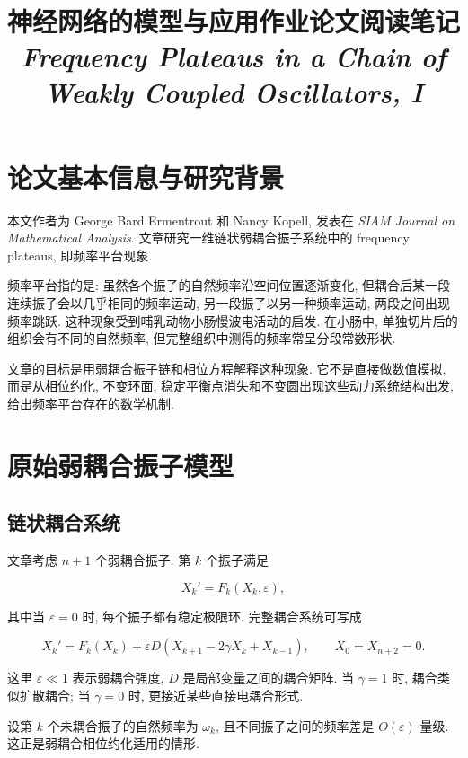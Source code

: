 \documentclass[oneside]{ctexart}
\title{神经网络的模型与应用作业论文阅读笔记\\[0.6ex]
\large \textit{Frequency Plateaus in a Chain of Weakly Coupled Oscillators, I}}
\author{}
\date{}
\newcommand{\eps}{\varepsilon}
\begin{document}
\maketitle

\section{论文基本信息与研究背景}

本文作者为 George Bard Ermentrout 和 Nancy Kopell, 发表在 \textit{SIAM Journal on Mathematical Analysis}. 文章研究一维链状弱耦合振子系统中的 frequency plateaus, 即频率平台现象.

频率平台指的是: 虽然各个振子的自然频率沿空间位置逐渐变化, 但耦合后某一段连续振子会以几乎相同的频率运动, 另一段振子以另一种频率运动, 两段之间出现频率跳跃. 这种现象受到哺乳动物小肠慢波电活动的启发. 在小肠中, 单独切片后的组织会有不同的自然频率, 但完整组织中测得的频率常呈分段常数形状.

文章的目标是用弱耦合振子链和相位方程解释这种现象. 它不是直接做数值模拟, 而是从相位约化, 不变环面, 稳定平衡点消失和不变圆出现这些动力系统结构出发, 给出频率平台存在的数学机制.

\section{原始弱耦合振子模型}

\subsection{链状耦合系统}

文章考虑 $n+1$ 个弱耦合振子. 第 $k$ 个振子满足

\begin{equation}
    X_k'=F_k(X_k,\eps),
\end{equation}

其中当 $\eps=0$ 时, 每个振子都有稳定极限环. 完整耦合系统可写成

\begin{equation}
    X_k'=F_k(X_k)+\eps D(X_{k+1}-2\gamma X_k+X_{k-1}),
    \qquad X_0=X_{n+2}=0.
\end{equation}

这里 $\eps\ll 1$ 表示弱耦合强度, $D$ 是局部变量之间的耦合矩阵. 当 $\gamma=1$ 时, 耦合类似扩散耦合; 当 $\gamma=0$ 时, 更接近某些直接电耦合形式.

设第 $k$ 个未耦合振子的自然频率为 $\omega_k$, 且不同振子之间的频率差是 $O(\eps)$ 量级. 这正是弱耦合相位约化适用的情形.
\end{document}
